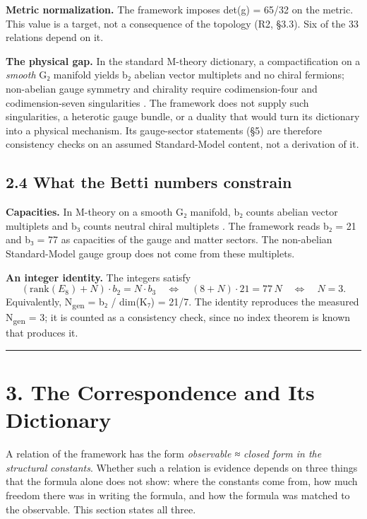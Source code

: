 \documentclass[11pt,a4paper]{article}
\begin{document}
\textbf{Metric normalization.} The framework imposes det(g) = 65/32 on the metric. This value is a target, not a consequence of the topology (R2, §3.3). Six of the 33 relations depend on it.

\textbf{The physical gap.} In the standard M-theory dictionary, a compactification on a \emph{smooth} G₂ manifold yields b₂ abelian vector multiplets and no chiral fermions; non-abelian gauge symmetry and chirality require codimension-four and codimension-seven singularities \cite{25,11}. The framework does not supply such singularities, a heterotic gauge bundle, or a duality that would turn its dictionary into a physical mechanism. Its gauge-sector statements (§5) are therefore consistency checks on an assumed Standard-Model content, not a derivation of it.

\subsection{2.4 What the Betti numbers constrain}\label{what-the-betti-numbers-constrain}

\textbf{Capacities.} In M-theory on a smooth G₂ manifold, b₂ counts abelian vector multiplets and b₃ counts neutral chiral multiplets \cite{11}. The framework reads b₂ = 21 and b₃ = 77 as capacities of the gauge and matter sectors. The non-abelian Standard-Model gauge group does not come from these multiplets.

\textbf{An integer identity.} The integers satisfy \[(\mathrm{rank}(E_8) + N) \cdot b_2 = N \cdot b_3 \quad\Longleftrightarrow\quad (8 + N) \cdot 21 = 77\,N \quad\Longleftrightarrow\quad N = 3.\] Equivalently, N\textsubscript{gen} = b₂ / dim(K₇) = 21/7. The identity reproduces the measured N\textsubscript{gen} = 3; it is counted as a consistency check, since no index theorem is known that produces it.

\begin{center}\rule{\linewidth}{0.5pt}\end{center}

\section{3. The Correspondence and Its Dictionary}\label{the-correspondence-and-its-dictionary}

A relation of the framework has the form \emph{observable ≈ closed form in the structural constants}. Whether such a relation is evidence depends on three things that the formula alone does not show: where the constants come from, how much freedom there was in writing the formula, and how the formula was matched to the observable. This section states all three.
\end{document}
